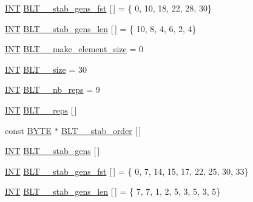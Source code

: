 \begin{DoxyCompactItemize}
\item 
\mbox{\hyperlink{galois_8h_a09fddde158a3a20bd2dcadb609de11dc}{I\+NT}} \mbox{\hyperlink{data___b_l_t_8_c_a9eaee01a05fb059549a9f1fdfef58889}{B\+L\+T\+\_\+\_\+stab\+\_\+gens\+\_\+fst}} \mbox{[}$\,$\mbox{]} = \{ 0, 10, 18, 22, 28, 30\}
\item 
\mbox{\hyperlink{galois_8h_a09fddde158a3a20bd2dcadb609de11dc}{I\+NT}} \mbox{\hyperlink{data___b_l_t_8_c_a605ef76f5b9cd166ed863d567b553b93}{B\+L\+T\+\_\+\_\+stab\+\_\+gens\+\_\+len}} \mbox{[}$\,$\mbox{]} = \{ 10, 8, 4, 6, 2, 4\}
\item 
\mbox{\hyperlink{galois_8h_a09fddde158a3a20bd2dcadb609de11dc}{I\+NT}} \mbox{\hyperlink{data___b_l_t_8_c_a9328044a1d557ce659e41b38acd73728}{B\+L\+T\+\_\+\_\+make\+\_\+element\+\_\+size}} = 0
\item 
\mbox{\hyperlink{galois_8h_a09fddde158a3a20bd2dcadb609de11dc}{I\+NT}} \mbox{\hyperlink{data___b_l_t_8_c_a67d1963e5959fb786946d23a74187657}{B\+L\+T\+\_\+\_\+size}} = 30
\item 
\mbox{\hyperlink{galois_8h_a09fddde158a3a20bd2dcadb609de11dc}{I\+NT}} \mbox{\hyperlink{data___b_l_t_8_c_a11a79b67ccaa0eab11dd9068bd7488f2}{B\+L\+T\+\_\+\_\+nb\+\_\+reps}} = 9
\item 
\mbox{\hyperlink{galois_8h_a09fddde158a3a20bd2dcadb609de11dc}{I\+NT}} \mbox{\hyperlink{data___b_l_t_8_c_a931eae1dcf9bd8813b2be5c714eaa21c}{B\+L\+T\+\_\+\_\+reps}} \mbox{[}$\,$\mbox{]}
\item 
const \mbox{\hyperlink{galois_8h_ab6cc7b4aeb6ea31aba2b3fbfc83ff5e6}{B\+Y\+TE}} $\ast$ \mbox{\hyperlink{data___b_l_t_8_c_af9ea3f34a76335fb1a854669923d3fab}{B\+L\+T\+\_\+\_\+stab\+\_\+order}} \mbox{[}$\,$\mbox{]}
\item 
\mbox{\hyperlink{galois_8h_a09fddde158a3a20bd2dcadb609de11dc}{I\+NT}} \mbox{\hyperlink{data___b_l_t_8_c_a799f25db02c1ba2de67411b6b052c31b}{B\+L\+T\+\_\+\_\+stab\+\_\+gens}} \mbox{[}$\,$\mbox{]}
\item 
\mbox{\hyperlink{galois_8h_a09fddde158a3a20bd2dcadb609de11dc}{I\+NT}} \mbox{\hyperlink{data___b_l_t_8_c_a21657167c209e9c9909f66961a908a8b}{B\+L\+T\+\_\+\_\+stab\+\_\+gens\+\_\+fst}} \mbox{[}$\,$\mbox{]} = \{ 0, 7, 14, 15, 17, 22, 25, 30, 33\}
\item 
\mbox{\hyperlink{galois_8h_a09fddde158a3a20bd2dcadb609de11dc}{I\+NT}} \mbox{\hyperlink{data___b_l_t_8_c_a322c464c53a10332715e68d240ecf161}{B\+L\+T\+\_\+\_\+stab\+\_\+gens\+\_\+len}} \mbox{[}$\,$\mbox{]} = \{ 7, 7, 1, 2, 5, 3, 5, 3, 5\}
\item 

\end{DoxyCompactItemize}
